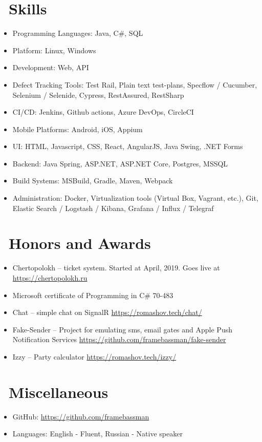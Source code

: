 \documentclass{resume}
\begin{document}
\section{\faCogs\ Skills}
\begin{itemize}[parsep=0.5ex]
  \item Programming Languages: Java, C\#, SQL
  \item Platform: Linux, Windows
  \item Development: Web, API
  \item Defect Tracking Tools: Test Rail, Plain text test-plans, Specflow / Cucumber, Selenium / Selenide, Cypress, RestAssured, RestSharp
  \item CI/CD: Jenkins, Github actions, Azure DevOps, CircleCI
  \item Mobile Platforms: Android, iOS, Appium
  \item UI: HTML, Javascript, CSS, React, AngularJS, Java Swing, .NET Forms
  \item Backend: Java Spring, ASP.NET, ASP.NET Core, Postgres, MSSQL
  \item Build Systems: MSBuild, Gradle, Maven, Webpack
  \item Administration: Docker, Virtualization tools (Virtual Box, Vagrant, etc.), Git, Elastic Search / Logstash / Kibana, Grafana / Influx / Telegraf
\end{itemize}

\section{\faHeartO\ Honors and Awards}
\begin{itemize}[parsep=0.5ex]
  \item{Chertopolokh -- ticket system. Started at April, 2019. Goes live at \href{https://chertopolokh.ru}{https://chertopolokh.ru}}
  \item{Microsoft certificate of Programming in C\# 70-483}
  \item{Chat -- simple chat on SignalR \href{https://romashov.tech/chat/}{https://romashov.tech/chat/}}
  \item{Fake-Sender -- Project for emulating sms, email gates and Apple Push Notification Services  \href{https://github.com/framebassman/fake-sender}{https://github.com/framebassman/fake-sender}}
  \item{Izzy -- Party calculator \href{https://romashov.tech/izzy/}{https://romashov.tech/izzy/}}
\end{itemize}

\section{\faInfo\ Miscellaneous}
\begin{itemize}[parsep=0.5ex]
  \item GitHub: \href{https://github.com/framebassman}{https://github.com/framebassman}
  \item Languages: English - Fluent, Russian - Native speaker
\end{itemize}

%
%
\end{document}
